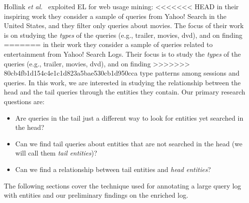 

Hollink \emph{et al.}~\cite{hollink2013web} exploited EL for web usage mining: 
<<<<<<< HEAD
in their inspiring work they consider a sample of 
queries from Yahoo! Search in the United States, and they filter only queries about movies. The focus
of their work is on studying the \emph{types} of the queries (e.g., trailer, movies, dvd), and on finding
=======
in their work they consider a sample of queries related to entertainment from 
Yahoo! Search Logs. Their focus is to study the \emph{types} of the queries (e.g., trailer, movies, dvd), and on finding
>>>>>>> 80cb4fb1d154c4e1c1d823a5bae530cb1d950cca
type patterns among sessions and queries. In this work, we are interested in studying the 
relationship between the head and the tail queries through the entities they contain. 
Our primary research questions are:
\begin{itemize}
	\item Are queries in the tail just a different way to look for entities yet searched in the head? 
	\item Can we find tail queries about entities that are not searched in the head (we will call them \emph{tail entities})?
	\item Can we find a relationship between tail entities and \emph{head entities}?  
\end{itemize} 

The following sections cover the technique used for annotating a large query log with entities and our 
preliminary findings on the enriched log.


 
